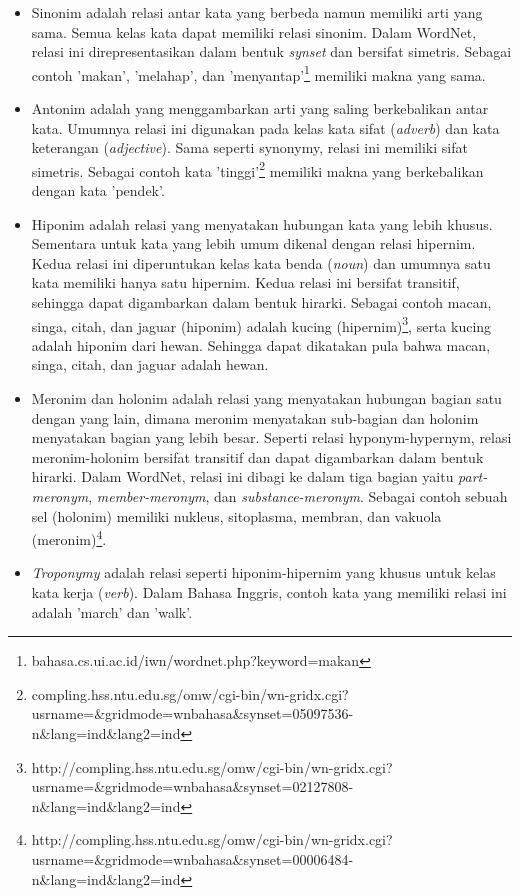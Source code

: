 \begin{itemize}
  \item Sinonim adalah relasi antar kata yang berbeda namun memiliki arti yang sama. Semua kelas kata dapat memiliki relasi sinonim. Dalam WordNet, relasi ini direpresentasikan dalam bentuk \textit{synset} dan bersifat simetris. Sebagai contoh 'makan', 'melahap', dan 'menyantap'\footnote{bahasa.cs.ui.ac.id/iwn/wordnet.php?keyword=makan} memiliki makna yang sama.
  \item Antonim adalah yang menggambarkan arti yang saling berkebalikan antar kata. Umumnya relasi ini digunakan pada kelas kata sifat (\textit{adverb}) dan kata keterangan (\textit{adjective}). Sama seperti synonymy, relasi ini memiliki sifat simetris. Sebagai contoh kata 'tinggi'\footnote{compling.hss.ntu.edu.sg/omw/cgi-bin/wn-gridx.cgi?usrname=\&gridmode=wnbahasa\&synset=05097536-n\&lang=ind\&lang2=ind} memiliki makna yang berkebalikan dengan kata 'pendek'.
  \item Hiponim adalah relasi yang menyatakan hubungan kata yang lebih khusus. Sementara untuk kata yang lebih umum dikenal dengan relasi hipernim. Kedua relasi ini diperuntukan kelas kata benda (\textit{noun}) dan umumnya satu kata memiliki hanya satu hipernim. Kedua relasi ini bersifat transitif, sehingga dapat digambarkan dalam bentuk hirarki. Sebagai contoh macan, singa, citah, dan jaguar (hiponim) adalah kucing (hipernim)\footnote{http://compling.hss.ntu.edu.sg/omw/cgi-bin/wn-gridx.cgi?usrname=\&gridmode=wnbahasa\&synset=02127808-n\&lang=ind\&lang2=ind}, serta kucing adalah hiponim dari hewan. Sehingga dapat dikatakan pula bahwa macan, singa, citah, dan jaguar adalah hewan.
  \item Meronim dan holonim adalah relasi yang menyatakan hubungan bagian satu dengan yang lain, dimana meronim menyatakan sub-bagian dan holonim menyatakan bagian yang lebih besar. Seperti relasi hyponym-hypernym, relasi meronim-holonim bersifat transitif dan dapat digambarkan dalam bentuk hirarki. Dalam WordNet, relasi ini dibagi ke dalam tiga bagian yaitu \textit{part-meronym}, \textit{member-meronym}, dan \textit{substance-meronym}. Sebagai contoh sebuah sel (holonim) memiliki nukleus, sitoplasma, membran, dan vakuola (meronim)\footnote{http://compling.hss.ntu.edu.sg/omw/cgi-bin/wn-gridx.cgi?usrname=\&gridmode=wnbahasa\&synset=00006484-n\&lang=ind\&lang2=ind}. 
  \item \textit{Troponymy} adalah relasi seperti hiponim-hipernim yang khusus untuk kelas kata kerja (\textit{verb}). Dalam Bahasa Inggris, contoh kata yang memiliki relasi ini adalah 'march' dan 'walk'.
\end{itemize}

